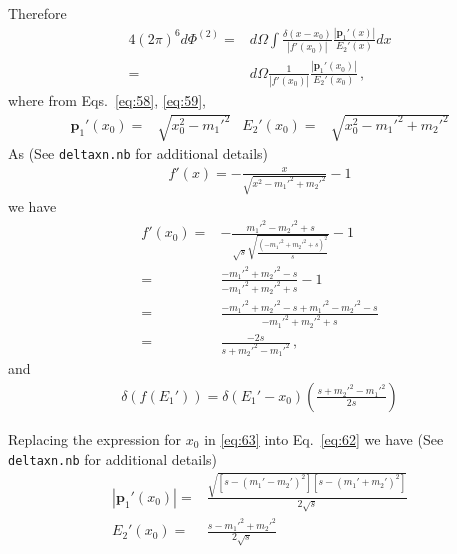 Therefore
\begin{align}
  \label{eq:61}
   4(2\pi)^6d\Phi^{(2)}=&d\Omega\int\frac{\delta(x-x_0)}{|f'(x_0)|}\frac{
     |\mathbf{p}_1'(x)|}{E_2'(x)}dx\nonumber\\
   =&d\Omega\frac{1}{|f'(x_0)|}\frac{
     |\mathbf{p}_1'(x_0)|}{E_2'(x_0)}\,,
\end{align}
where from Eqs.~\eqref{eq:58}, \eqref{eq:59},
\begin{align}
  \label{eq:62}
  \mathbf{p}_1'(x_0)=&\sqrt{x_0^2-{m_1'}^2}&
  E_2'(x_0)=&\sqrt{x_0^2-{m_1'}^2+{m_2'}^2}
\end{align}
As (See 
\texttt{deltaxn.nb} %
for additional details)
\begin{align}
  f'(x)=-\frac{x}{\sqrt{x^2-{m_1'}^2+{m_2'}^2}}-1
\end{align}
we have
\begin{align}
  \label{eq:64}
  f'(x_0)=&-\frac{{m_1'}^2-{m_2'}^2+s}{\sqrt{s}
   \sqrt{\frac{\left(-{m_1'}^2+{m_2'}^2+s\right)^2}{s}}}-1\nonumber\\
    =&\frac{-{m_1'}^2+{m_2'}^2-s}{-{m_1'}^2+{m_2'}^2+s}-1\nonumber\\
    =&\frac{-{m_1'}^2+{m_2'}^2-s+{m_1'}^2-{m_2'}^2-s}{-{m_1'}^2+{m_2'}^2+s}\nonumber\\
=&\frac{-2s}{s+{m_2'}^2-{m_1'}^2}\,,
\end{align}
and
\begin{align}
  \label{eq:65}
  \delta(f(E_1'))=\delta(E_1'-x_0)\left(\frac{s+{m_2'}^2-{m_1'}^2}{2s}\right)
\end{align}

Replacing the expression for $x_0$ in \eqref{eq:63} into Eq.~\eqref{eq:62} we have (See 
\texttt{deltaxn.nb}  %
for additional details)
\begin{align}
  \label{eq:66}
   |\mathbf{p}_1'(x_0)|=&\frac{\sqrt{[s-({m_1'}-{m_2'})^2][s-({m_1'}+{m_2'})^2]}}{2\sqrt{s}}\nonumber\\
E_2'(x_0)=&  \frac{s-{m_1'}^2+{m_2'}^2}{2\sqrt{s}}
\end{align}

